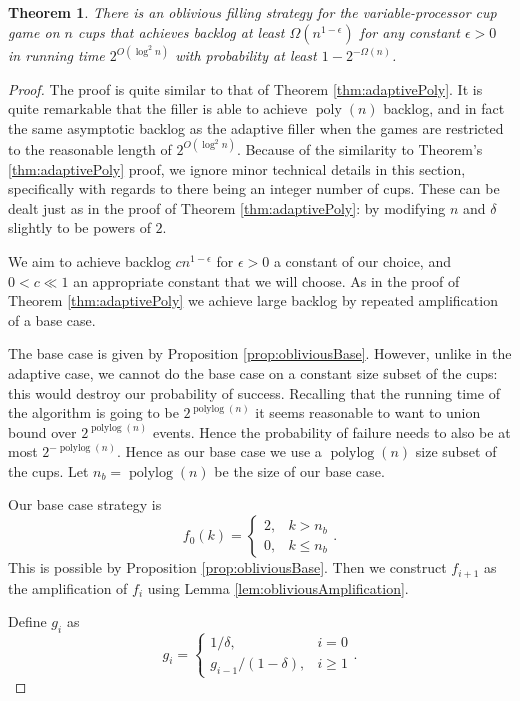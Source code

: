 \documentclass[twocolumn]{article}[10pt]
\DeclareMathOperator{\polylog}{\text{polylog}}
\DeclareMathOperator{\poly}{\text{poly}}
\newtheorem{theorem}{Theorem}
\begin{document}
\begin{theorem}
  \label{thm:obliviousPoly}
  There is an oblivious filling strategy for the variable-processor cup game on
  $n$ cups that achieves backlog at least $\Omega(n^{1-\epsilon})$ for any
  constant $\epsilon >0$ in running time $2^{O(\log^2 n)}$ with probability at least $1-2^{-\Omega(n)}$.
\end{theorem}
\begin{proof}
  The proof is quite similar to that of Theorem \ref{thm:adaptivePoly}.
  It is quite remarkable that the filler is able to 
  achieve $\poly(n)$ backlog, and in fact the same asymptotic backlog as the
  adaptive filler when the games are restricted to the reasonable length of
  $2^{O(\log^2 n)}$. Because of the similarity to Theorem's
  \ref{thm:adaptivePoly} proof, we ignore minor technical details in this
  section, specifically with regards to there being an integer number of cups.
  These can be dealt just as in the proof of Theorem \ref{thm:adaptivePoly}: by
  modifying $n$ and $\delta$ slightly to be powers of $2$.

  We aim to achieve backlog $cn^{1-\epsilon}$ for $\epsilon >  0$ a constant of
  our choice, and $0< c \ll 1$ an appropriate constant that we will choose.
  As in the proof of Theorem \ref{thm:adaptivePoly} we achieve large backlog
  by repeated amplification of a base case. 

  The base case is given by Proposition \ref{prop:obliviousBase}. However,
  unlike in the adaptive case, we cannot do the base case on a constant size
  subset of the cups: this would destroy our probability of success. Recalling
  that the running time of the algorithm is going to be $2^{\polylog(n)}$ it
  seems reasonable to want to union bound over $2^{\polylog(n)}$ events. Hence
  the probability of failure needs to also be at most $2^{-\polylog(n)}$.
  Hence as our base case we use a $\polylog(n)$ size subset of the cups. 
  Let $n_b = \polylog(n)$ be the size of our base case.

  Our base case strategy is 
  $$
  f_0(k)=
  \begin{cases}
    2, & k > n_b\\
    0, & k \le n_b
  \end{cases}.$$
  This is possible by Proposition \ref{prop:obliviousBase}.
  Then we construct $f_{i+1}$ as the amplification of $f_i$ using Lemma \ref{lem:obliviousAmplification}.

  Define $g_i$ as 
  $$
  g_i =
  \begin{cases}
    1/\delta, & i=0\\
    g_{i-1}/(1-\delta), & i\ge 1 
  \end{cases}.$$


\end{proof}
\end{document}
